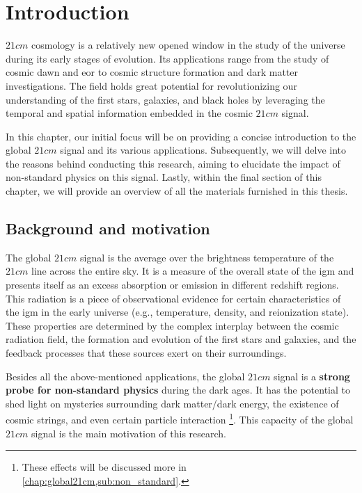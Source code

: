 \documentclass[12pt, TexShade, letterpaper]{report}
\begin{document}
 	\clearpage
	
	\glsresetall
\chapter{Introduction}
\label{chap:intro}
$21cm$ cosmology is a relatively new opened window in the study of the universe during its early stages of evolution. Its applications range from the study of cosmic dawn and \gls{eor} to cosmic structure formation and dark matter investigations\cite{SKA_dark_ages}. The field holds great potential for revolutionizing our understanding of the first stars, galaxies, and black holes by leveraging the temporal and spatial information embedded in the cosmic $21cm$ signal\cite{21cmfast_c}.\par

In this chapter, our initial focus will be on providing a concise introduction to the global $21cm$ signal and its various applications. Subsequently, we will delve into the reasons behind conducting this research, aiming to elucidate the impact of non-standard physics on this signal. Lastly, within the final section of this chapter, we will provide an overview of all the materials furnished in this thesis.\par
\section{Background and motivation}
The global $21cm$ signal is the average over the brightness temperature of the $21cm$ line across the entire sky. It is a measure of the overall state of the \gls{igm} and presents itself as an excess absorption or emission in different redshift regions. This radiation is a piece of observational evidence for certain characteristics of the \gls{igm} in the early universe (e.g., temperature, density, and reionization state). These properties are determined by the complex interplay between the cosmic radiation field, the formation and evolution of the first stars and galaxies, and the feedback processes that these sources exert on their surroundings\cite{21century}.\par
Besides all the above-mentioned applications, the global $21cm$ signal is a \textbf{strong probe for non-standard physics} during the dark ages. It has the potential to shed light on mysteries surrounding dark matter/dark energy, the existence of cosmic strings, and even certain particle interaction  \cite{dark_nature_21, constrain_dm_21, cosmic_string_brandenberger, ee_interaction_21, neutrino_21} \footnote{These effects will be discussed more in \ref{chap:global21cm,sub:non_standard}.}. This capacity of the global $21cm$ signal is the main motivation of this research.\par
\end{document}
